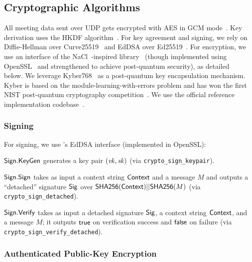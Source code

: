\subsection{Cryptographic Algorithms}\label{subsec:cryptoalgs}

All meeting data sent over UDP gets encrypted with AES in GCM mode~\cite{sp80038d}.
%
Key derivation uses the HKDF algorithm~\cite{rfc5869}.
%
For key agreement and signing, we rely on Diffie-Hellman over
Curve25519~\cite{bernstein2006curve25519} and EdDSA over Ed25519~\cite{eddsa}.
%
For encryption, we use an interface of the NaCl~\cite{nacl}-inspired \sodium{}
library~\cite{libsodium} (though implemented using OpenSSL~\cite{openssl} and strengthened to achieve post-quantum security), as detailed below.
%
We leverage Kyber768~\cite{kyber} as a post-quantum key encapsulation mechanism. Kyber is based on the module-learning-with-errors problem and has won the first NIST post-quantum cryptography competition~\cite{nistpqc}. We use the official reference implementation codebase~\cite{kybercode}.

\subsubsection{Signing}

For signing, we use \sodium 's EdDSA interface (implemented in OpenSSL):
%
\begin{itemize*}
   \item ${\sf Sign}.\mathsf{KeyGen}$ generates a key pair $(\mathit{vk}, \mathit{sk})$ (via
   \texttt{crypto\_sign\_keypair}).
   \item ${\sf Sign}.\mathsf{Sign}$ takes as input a context string ${\sf Context}$ and a message $M$ and outputs a
   ``detached'' signature ${\sf Sig}$ over ${\sf SHA256}({\sf Context}) || {\sf SHA256}(M)$ (via
   \texttt{crypto\_sign\_detached}).
   \item ${\sf Sign}.\mathsf{Verify}$ takes as input a detached signature ${\sf Sig}$, a context
   string ${\sf Context}$, and a message $M$; it outputs $\mathsf{true}$ on verification success and $\mathsf{false}$ on
   failure (via \texttt{crypto\_\-sign\_\-verify\_\-detached}).
\end{itemize*}

\subsubsection{Authenticated Public-Key Encryption}\label{subsubsec:meetingcrypto}

